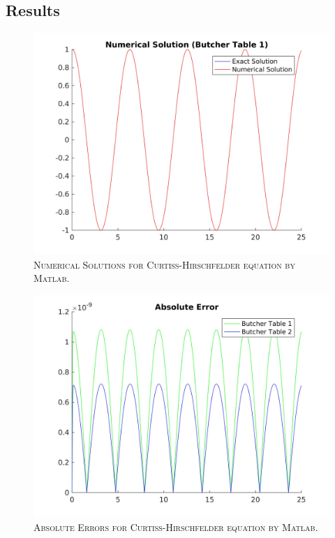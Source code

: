 \documentclass[a4paper,oneside]{book}
\numberwithin{equation}{chapter}
\begin{document}
\subsection{Results}
\begin{figure}[H]
\centering
\includegraphics[scale=0.09]{ns1}
\caption{\textsc{Numerical Solutions for Curtiss-Hirschfelder equation by Matlab.}}
\end{figure}
\begin{figure}[H]
\centering
\includegraphics[scale=0.09]{ae}
\caption{\textsc{Absolute Errors for Curtiss-Hirschfelder equation by Matlab.}}
\end{figure}
\end{document}
